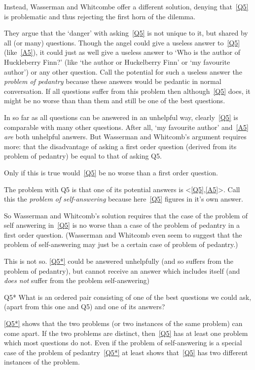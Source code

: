 Instead, Wasserman and Whitcombe offer a different solution, denying that~\ref{Q5} is problematic and thus rejecting the first horn of the dilemma.

They argue that the `danger' with asking~\ref{Q5} is not unique to it, but shared by all (or many) questions. 
Though the angel could give a useless answer to~\ref{Q5} (like~\ref{A5}), it could just as well give a useless answer to `Who is the author of Huckleberry Finn?' (like `the author or Huckelberry Finn' or `my favourite author') or any other question.
Call the potential for such a useless answer the \textit{problem of pedantry} because these answers would be pedantic in normal conversation.
If all questions suffer from this problem then although~\ref{Q5} does, it might be no worse than than them and still be one of the best questions.

In so far as all questions can be answered in an unhelpful way, clearly~\ref{Q5} is comparable with many other questions.
After all, `my favourite author' and~\ref{A5} \emph{are} both unhelpful answers.
But Wasserman and Whitcomb's argument requires more: that the disadvantage of asking a first order question (derived from its problem of pedantry) be equal to that of asking Q5.

Only if this is true would~\ref{Q5} be no worse than a first order question.

The problem with Q5 is that one of its potential answers is <\ref{Q5},\ref{A5}>.
Call this the \textit{problem of self-answering} because here~\ref{Q5} figures in it's own answer.

So Wasserman and Whitcomb's solution requires that the case of the problem of self answering in~\ref{Q5} is no worse than a case of the problem of pedantry in a first order question.
(Wasserman and Whitcomb even seem to suggest that the problem of self-answering may just be a certain case of problem of pedantry.)

This is not so.
\ref{Q5*} could be answered unhelpfully (and so suffers from the problem of pedantry), but cannot receive an answer which includes itself (and \emph{does not} suffer from the problem self-answering)

	\begin{principle}{Q5*}\label{Q5*}
	What is an ordered pair consisting of one of the best questions we could ask, (apart from this one and Q5) and one of its answers?
	\end{principle}

\ref{Q5*} shows that the two problems (or two instances of the same problem) can come apart.
If the two problems are distinct, then~\ref{Q5} has at least one problem which most questions do not.
Even if the problem of self-answering is a special case of the problem of pedantry~\ref{Q5*} at least shows that~\ref{Q5} has two different instances of the problem.


